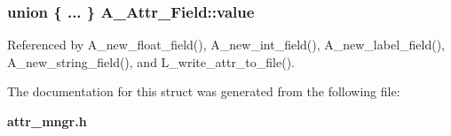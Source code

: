\subsubsection{\setlength{\rightskip}{0pt plus 5cm}union \{ ... \} 
   \bf{A\_\-Attr\_\-Field::value}}\label{structA__Attr__Field_4829f598f93c881de0d78b3b3b4510c5}




Referenced by A\_\-new\_\-float\_\-field(), A\_\-new\_\-int\_\-field(), A\_\-new\_\-label\_\-field(), A\_\-new\_\-string\_\-field(), and L\_\-write\_\-attr\_\-to\_\-file().

The documentation for this struct was generated from the following file:\begin{CompactItemize}
\item 
\bf{attr\_\-mngr.h}\end{CompactItemize}
